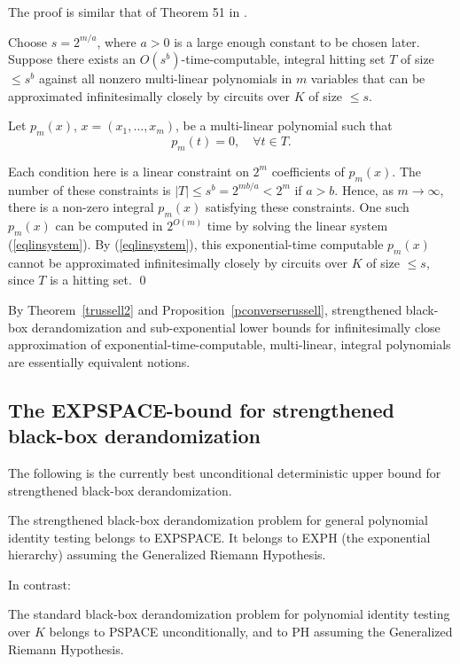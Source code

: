 \documentclass[11pt]{article}
\begin{document}
\proof The proof is similar that of Theorem 51 in \cite{agrawal}.

Choose $s=2^{m/a}$, where $a>0$ is a large  enough constant to be chosen later.
Suppose there exists an $O(s^b)$-time-computable, integral hitting set 
$T$ of size $\le s^b$ against all nonzero multi-linear polynomials in $m$ variables that 
can be approximated infinitesimally closely by  circuits over $K$ of size $\le s$.


Let $p_m(x)$, $x=(x_1,\ldots,x_m)$, be a multi-linear polynomial such that 
\begin{equation} \label{eqlinsystem}
p_m(t) =0, \quad \forall t  \in T.
\end{equation}

Each condition here is a linear constraint on $2^m$ coefficients of $p_m(x)$.
The number of these constraints is $|T| \le s^b =2^{m b /a}< 2^m$ if $a > b$. 
Hence, as $m \rightarrow \infty$, 
there is a non-zero integral $p_m(x)$ satisfying these constraints. One such  
$p_m(x)$ can be computed in $2^{O(m)}$ time 
by solving the linear system (\ref{eqlinsystem}). By (\ref{eqlinsystem}), this exponential-time computable $p_m(x)$ cannot be approximated
infinitesimally closely by  circuits over $K$ of size $\le s$,  since $T$ is a hitting set. 
\qed


By Theorem~\ref{trussell2} and Proposition~\ref{pconverserussell}, strengthened black-box derandomization and sub-exponential
lower bounds for infinitesimally close approximation of exponential-time-computable, multi-linear, integral polynomials 
are essentially equivalent notions.


\subsection{The EXPSPACE-bound for strengthened black-box derandomization} \label{sstdvsstrong}
The following is the currently best unconditional deterministic upper bound for strengthened black-box 
derandomization.

\begin{theorem} \label{tstrongexp}
The strengthened black-box derandomization problem for general polynomial identity testing belongs to EXPSPACE.
It belongs to EXPH (the exponential hierarchy)
assuming  the Generalized Riemann Hypothesis.
\end{theorem}

In contrast:

\begin{prop} \label{pstandard}
The standard black-box derandomization problem for polynomial identity testing over $K$ belongs to PSPACE unconditionally, and 
to PH assuming the Generalized Riemann Hypothesis.
\end{prop} 
\end{document}

